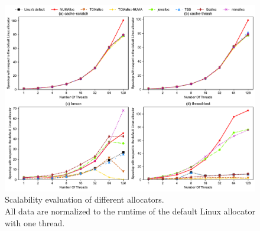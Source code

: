  

\begin{figure}[!th]
    \centering
    \includegraphics[width=6.1in]{figure/sythentic-scalobility-new.pdf}
    \caption{Scalability evaluation of different allocators.\\ All data are normalized to the runtime of the default Linux allocator with one thread.}
    \label{sythentic-scalability}
\end{figure}


